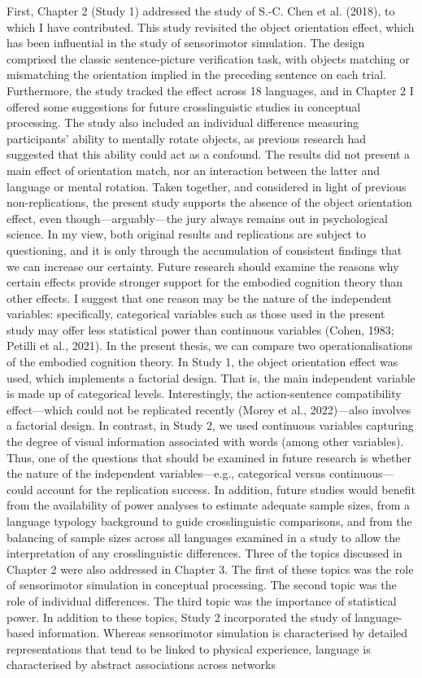 \documentclass[
  12pt,
  man,floatsintext]{apa7}
\begin{document}
First, Chapter 2 (Study 1) addressed the study of S.-C. Chen et al. (2018), to which I have contributed. This study revisited the object orientation effect, which has been influential in the study of sensorimotor simulation. The design comprised the classic sentence-picture verification task, with objects matching or mismatching the orientation implied in the preceding sentence on each trial. Furthermore, the study tracked the effect across 18 languages, and in Chapter 2 I offered some suggestions for future crosslinguistic studies in conceptual processing. The study also included an individual difference measuring participants' ability to mentally rotate objects, as previous research had suggested that this ability could act as a confound. The results did not present a main effect of orientation match, nor an interaction between the latter and language or mental rotation. Taken together, and considered in light of previous non-replications, the present study supports the absence of the object orientation effect, even though---arguably---the jury always remains out in psychological science. In my view, both original results and replications are subject to questioning, and it is only through the accumulation of consistent findings that we can increase our certainty. Future research should examine the reasons why certain effects provide stronger support for the embodied cognition theory than other effects. I suggest that one reason may be the nature of the independent variables: specifically, categorical variables such as those used in the present study may offer less statistical power than continuous variables (Cohen, 1983; Petilli et al., 2021). In the present thesis, we can compare two operationalisations of the embodied cognition theory. In Study 1, the object orientation effect was used, which implements a factorial design. That is, the main independent variable is made up of categorical levels. Interestingly, the action-sentence compatibility effect---which could not be replicated recently (Morey et al., 2022)---also involves a factorial design. In contrast, in Study 2, we used continuous variables capturing the degree of visual information associated with words (among other variables). Thus, one of the questions that should be examined in future research is whether the nature of the independent variables---e.g., categorical versus continuous---could account for the replication success. In addition, future studies would benefit from the availability of power analyses to estimate adequate sample sizes, from a language typology background to guide crosslinguistic comparisons, and from the balancing of sample sizes across all languages examined in a study to allow the interpretation of any crosslinguistic differences. Three of the topics discussed in Chapter 2 were also addressed in Chapter 3. The first of these topics was the role of sensorimotor simulation in conceptual processing. The second topic was the role of individual differences. The third topic was the importance of statistical power. In addition to these topics, Study 2 incorporated the study of language-based information. Whereas sensorimotor simulation is characterised by detailed representations that tend to be linked to physical experience, language is characterised by abstract associations across networks 
\end{document}
